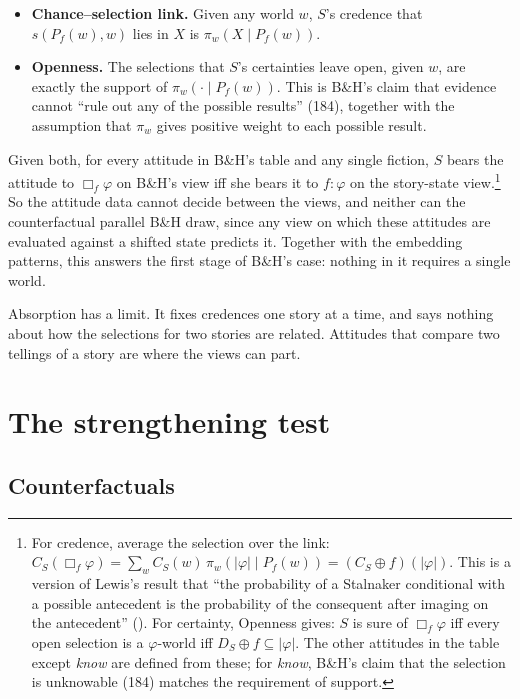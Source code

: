 \documentclass[
  11pt,
  letterpaper,
  DIV=11,
  numbers=noendperiod,
  twoside]{scrartcl}
\providecommand{\tightlist}{%
  \setlength{\itemsep}{0pt}\setlength{\parskip}{0pt}}
\begin{document}
\begin{itemize}
\tightlist
\item
  \textbf{Chance--selection link.} Given any world \(w\), \(S\)'s
  credence that \(s(P_f(w), w)\) lies in \(X\) is
  \(\pi_w(X \mid P_f(w))\).
\item
  \textbf{Openness.} The selections that \(S\)'s certainties leave open,
  given \(w\), are exactly the support of \(\pi_w(\cdot \mid P_f(w))\).
  This is B\&H's claim that evidence cannot ``rule out any of the
  possible results'' (184), together with the assumption that \(\pi_w\)
  gives positive weight to each possible result.
\end{itemize}

Given both, for every attitude in B\&H's table and any single fiction,
\(S\) bears the attitude to \(\Box_f \varphi\) on B\&H's view iff she
bears it to \(f{:}\varphi\) on the story-state view.\footnote{For
  credence, average the selection over the link:
  \(C_S(\Box_f \varphi) = \sum_w C_S(w)\, \pi_w(|\varphi| \mid P_f(w)) = (C_S \oplus f)(|\varphi|)\).
  This is a version of Lewis's result that ``the probability of a
  Stalnaker conditional with a possible antecedent is the probability of
  the consequent after imaging on the antecedent''
  (). For certainty, Openness gives:
  \(S\) is sure of \(\Box_f \varphi\) iff every open selection is a
  \(\varphi\)-world iff \(D_S \oplus f \subseteq |\varphi|\). The other
  attitudes in the table except \emph{know} are defined from these; for
  \emph{know}, B\&H's claim that the selection is unknowable (184)
  matches the requirement of support.} So the attitude data cannot
decide between the views, and neither can the counterfactual parallel
B\&H draw, since any view on which these attitudes are evaluated against
a shifted state predicts it. Together with the embedding patterns, this
answers the first stage of B\&H's case: nothing in it requires a single
world.

Absorption has a limit. It fixes credences one story at a time, and says
nothing about how the selections for two stories are related. Attitudes
that compare two tellings of a story are where the views can part.

\section{The strengthening test}\label{sec-test}

\subsection{Counterfactuals}\label{counterfactuals}
\end{document}
